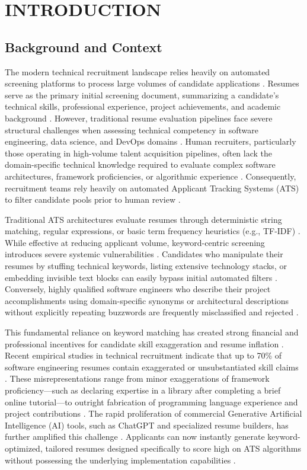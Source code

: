 \chapter{INTRODUCTION}

\section{Background and Context}

The modern technical recruitment landscape relies heavily on automated screening platforms to process large volumes of candidate applications \cite{ref1}. Resumes serve as the primary initial screening document, summarizing a candidate's technical skills, professional experience, project achievements, and academic background \cite{ref2}. However, traditional resume evaluation pipelines face severe structural challenges when assessing technical competency in software engineering, data science, and DevOps domains \cite{ref3, ref4}. Human recruiters, particularly those operating in high-volume talent acquisition pipelines, often lack the domain-specific technical knowledge required to evaluate complex software architectures, framework proficiencies, or algorithmic experience \cite{ref5}. Consequently, recruitment teams rely heavily on automated Applicant Tracking Systems (ATS) to filter candidate pools prior to human review \cite{ref6, ref7}.

Traditional ATS architectures evaluate resumes through deterministic string matching, regular expressions, or basic term frequency heuristics (e.g., TF-IDF) \cite{ref1, ref8}. While effective at reducing applicant volume, keyword-centric screening introduces severe systemic vulnerabilities \cite{ref9}. Candidates who manipulate their resumes by stuffing technical keywords, listing extensive technology stacks, or embedding invisible text blocks can easily bypass initial automated filters \cite{ref10}. Conversely, highly qualified software engineers who describe their project accomplishments using domain-specific synonyms or architectural descriptions without explicitly repeating buzzwords are frequently misclassified and rejected \cite{ref11, ref12}.

This fundamental reliance on keyword matching has created strong financial and professional incentives for candidate skill exaggeration and resume inflation \cite{ref9, ref13}. Recent empirical studies in technical recruitment indicate that up to 70\% of software engineering resumes contain exaggerated or unsubstantiated skill claims \cite{ref10, ref14}. These misrepresentations range from minor exaggerations of framework proficiency—such as declaring expertise in a library after completing a brief online tutorial—to outright fabrication of programming language experience and project contributions \cite{ref15, ref16}. The rapid proliferation of commercial Generative Artificial Intelligence (AI) tools, such as ChatGPT and specialized resume builders, has further amplified this challenge \cite{ref17, ref18}. Applicants can now instantly generate keyword-optimized, tailored resumes designed specifically to score high on ATS algorithms without possessing the underlying implementation capabilities \cite{ref5, ref19}.

